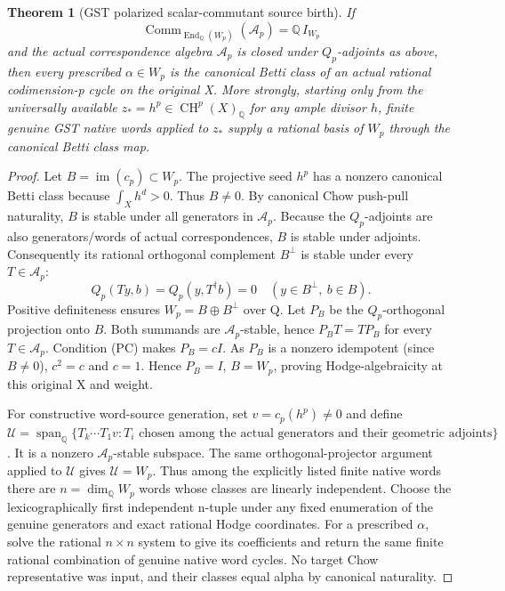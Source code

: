 \documentclass[11pt]{article}
\newtheorem{theorem}{Theorem}
\newcommand{\Q}{\mathbb Q}
\newcommand{\CH}{\operatorname{CH}}
\newcommand{\End}{\operatorname{End}}
\newcommand{\Comm}{\operatorname{Comm}}
\begin{document}
\begin{theorem}[GST polarized scalar-commutant source birth]
If
\[
 \boxed{\Comm_{\End_\Q(W_p)}(\mathcal A_p)=\Q\,I_{W_p}}
 \tag{PC}
\]
and the actual correspondence algebra $\mathcal A_p$ is closed under $Q_p$-adjoints as above, then every prescribed $\alpha\in W_p$ is the \emph{canonical Betti class} of an actual rational codimension-p cycle on the original X.
More strongly, starting only from the universally available $z_*=h^p\in\CH^p(X)_{\Q}$ for any ample divisor $h$, finite genuine GST native words applied to $z_*$ supply a rational basis of $W_p$ through the canonical Betti class map.
\end{theorem}
\begin{proof}
Let $B=\operatorname{im}(c_p)\subset W_p$. The projective seed $h^p$ has a nonzero canonical Betti class because $\int_Xh^d>0$. Thus $B\ne0$. By canonical Chow push-pull naturality, $B$ is stable under all generators in $\mathcal A_p$. Because the $Q_p$-adjoints are also generators/words of actual correspondences, $B$ is stable under adjoints. Consequently its rational orthogonal complement $B^\perp$ is stable under every $T\in\mathcal A_p$:
\[
 Q_p(Ty,b)=Q_p(y,T^\dagger b)=0 \quad
 (y\in B^\perp,\ b\in B).
\]
Positive definiteness ensures $W_p=B\oplus B^\perp$ over Q. Let $P_B$ be the $Q_p$-orthogonal projection onto $B$. Both summands are $\mathcal A_p$-stable, hence $P_BT=TP_B$ for every $T\in\mathcal A_p$. Condition (PC) makes $P_B=cI$. As $P_B$ is a nonzero idempotent (since $B\ne0$), $c^2=c$ and $c=1$. Hence $P_B=I$, $B=W_p$, proving Hodge-algebraicity at this original X and weight.

For constructive word-source generation, set $v=c_p(h^p)\ne0$ and define
\(\mathcal U=\operatorname{span}_{\Q}\{T_k\cdots T_1v:
 T_i\text{ chosen among the actual generators and their geometric adjoints}\}\).
It is a nonzero $\mathcal A_p$-stable subspace. The same orthogonal-projector argument applied to $\mathcal U$ gives $\mathcal U=W_p$. Thus among the explicitly listed finite native words there are $n=\dim_\Q W_p$ words whose classes are linearly independent. Choose the lexicographically first independent n-tuple under any fixed enumeration of the genuine generators and exact rational Hodge coordinates. For a prescribed $\alpha$, solve the rational $n\times n$ system to give its coefficients and return the same finite rational combination of genuine native word cycles. No target Chow representative was input, and their classes equal alpha by canonical naturality.
\end{proof}
\end{document}
